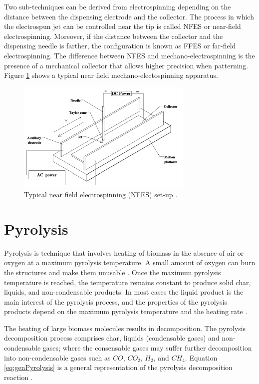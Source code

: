 Two sub-techniques can be derived from electrospinning depending on the distance between the dispensing electrode and the collector. The process in which the electrospun jet can be controlled near the tip is called NFES or near-field electrospinning. \cite{Cisquella-Serra2019} Moreover, if the distance between the collector and the dispensing needle is farther, the configuration is known as FFES or far-field electrospinning. \cite{Nataraj2012} The difference between NFES and mechano-electrospinning is the presence of a mechanical collector that allows higher precision when patterning. Figure \ref{fig:NFES} shows a typical near field mechano-electospinning apparatus.

\begin{figure}[th]
\centering
\includegraphics[width=0.75\textwidth]{./Figures/NFES.png}
\decoRule
\caption[Near Field Electrospinning set-up]{Typical near field electrospinning (NFES) set-up \cite{Zhu2016}.}
\label{fig:NFES}
\end{figure}

\section{Pyrolysis}
Pyrolysis is technique that involves heating of biomass in the absence of air or oxygen at a maximum pyrolysis temperature. A small amount of oxygen can burn the structures and make them unusable \cite{Pramanick2018}. Once the maximum pyrolysis temperature is reached, the temperature remains constant to produce solid char, liquids, and non-condensable products. In most cases the liquid product is the main interest of the pyrolysis process, and the properties of the pyrolysis products depend on the maximum pyrolysis temperature and the heating rate \cite{Pramanick2018,Basu2018}.

The heating of large biomass molecules results in decomposition. The pyrolysis decomposition process comprises char, liquids (condensable gases) and non-condensable gases; where the consensable gases may suffer further decomposition into non-condensable gases such as $C O$, $C O_{2}$, $H_{2}$, and $C H_{4}$. Equation \ref{eq:genPyrolysis} is a general representation of the pyrolysis decomposition reaction \cite{Basu2018}.

